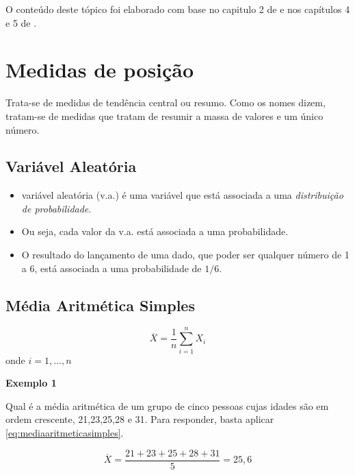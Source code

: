 \documentclass[
]{book}
\providecommand{\tightlist}{%
  \setlength{\itemsep}{0pt}\setlength{\parskip}{0pt}}
\begin{document}
O conteúdo deste tópico foi elaborado com base no capitulo 2 de \citet{Sartoris2013} e nos capítulos 4 e 5 de \citet{Hoffmann2006}.

\hypertarget{medidas-de-posiuxe7uxe3o}{%
\section{Medidas de posição}\label{medidas-de-posiuxe7uxe3o}}

Trata-se de medidas de tendência central ou resumo. Como os nomes dizem, tratam-se de medidas que tratam de resumir a massa de valores e um único número.

\hypertarget{variuxe1vel-aleatuxf3ria}{%
\subsection{Variável Aleatória}\label{variuxe1vel-aleatuxf3ria}}

\begin{itemize}
\tightlist
\item
  variável aleatória (v.a.) é uma variável que está associada a uma \emph{distribuição de probabilidade}.
\item
  Ou seja, cada valor da v.a. está associada a uma probabilidade.
\item
  O resultado do lançamento de uma dado, que poder ser qualquer número de 1 a 6, está associada a uma probabilidade de \(1/6\).
\end{itemize}

\hypertarget{muxe9dia-aritmuxe9tica-simples}{%
\subsection{Média Aritmética Simples}\label{muxe9dia-aritmuxe9tica-simples}}

\begin{equation}
    \overline{X} = \frac{1}{n} \sum_{i=1}^{n} X_i
    \label{eq:mediaaritmeticasimples}
\end{equation}
onde \(i =1, ...,n\)

\textbf{Exemplo 1}

Qual é a média aritmética de um grupo de cinco pessoas cujas idades são em ordem crescente, 21,23,25,28 e 31. Para responder, basta aplicar \eqref{eq:mediaaritmeticasimples}.

\begin{equation*}
  \overline{X} = \frac{21+23+25+28+31}{5} = 25,6
\end{equation*}
\end{document}
